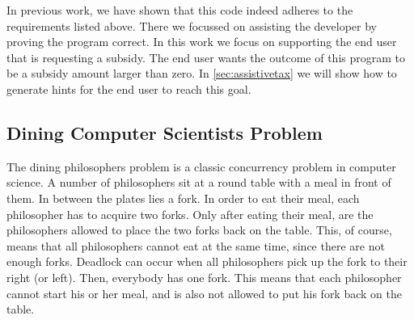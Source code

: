 In previous work, we have shown that this code indeed adheres to the requirements listed above.
There we focussed on assisting the developer by proving the program correct.
In this work we focus on supporting the end user that is requesting a subsidy.
The end user wants the outcome of this program to be a subsidy amount larger than zero.
In \cref{sec:assistivetax} we will show how to generate hints for the end user to reach this goal.


\subsection{Dining Computer Scientists Problem}
\label{sec:dining}

The dining philosophers problem is a classic concurrency problem in computer science.
A number of philosophers sit at a round table with a meal in front of them.
In between the plates lies a fork.
In order to eat their meal, each philosopher has to acquire two forks.
Only after eating their meal, are the philosophers allowed to place the two forks back on the table.
This, of course, means that all philosophers cannot eat at the same time, since there are not enough forks.
Deadlock can occur when all philosophers pick up the fork to their right (or left).
Then, everybody has one fork.
This means that each philosopher cannot start his or her meal, and is also not allowed to put his fork back on the table.\\

